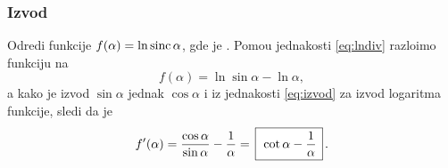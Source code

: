 \subsubsection{Izvod}

\def\sinc{\mathop{\rm sinc}}
\zadatak Odredi  funkcije $f(\alpha)=\ln\sinc\alpha$, gde je  
\smash{$\displaystyle{\sinc\alpha=\frac{\sin\alpha}{\alpha}}$}.
\resenje Pomo{\cc}u jednakosti \eqref{eq:lndiv} razlo{\zv}imo funkciju na 
$$f(\alpha)=\ln\sin\alpha-\ln\alpha,$$ 
a kako je izvod $\sin\alpha$ jednak $\cos\alpha$ i iz jednakosti 
\eqref{eq:izvod} za izvod logaritma funkcije, sledi da je
$$
f'(\alpha)
=\frac{\cos\alpha}{\sin\alpha} - \frac1\alpha
=\ram{\cot\alpha - \frac1\alpha}.
$$
